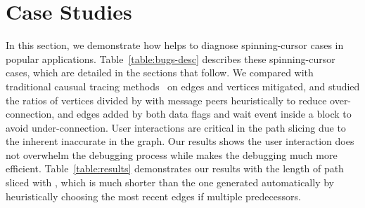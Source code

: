 \section{Case Studies}\label{sec:casestudy}

In this section, we demonstrate how \xxx helps to diagnose \nbug spinning-cursor
cases in \napps popular applications. Table~\ref{table:bugs-desc} describes
these spinning-cursor cases, which are detailed in the sections that follow.
We compared \xxx with traditional causual tracing methods~\cite{XXXX} on edges
and vertices \xxx mitigated, and studied the ratios of vertices divided by
with message peers heuristically to reduce over-connection, and edges added
by both data flags and wait event inside a block to avoid under-connection.
User interactions are critical in the path slicing due to the inherent
inaccurate in the graph. Our results shows the user interaction does not
overwhelm the debugging process while makes the debugging much more efficient.
Table~\ref{table:results} demonstrates our results with the length of path
sliced with \xxx, which is much shorter than the one generated automatically by
heuristically choosing the most recent edges if multiple predecessors.







